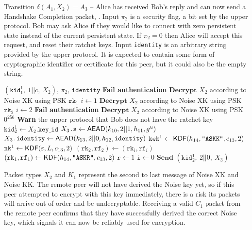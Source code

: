 \documentclass{article}
\begin{document}
\begin{algorithm}
	\caption{Transition $\delta(A_1, X_2)=A_3$ -- Alice has received Bob's reply and can now send a Handshake Completion packet, . Input $\pi_2$ is a security flag, a bit set by the upper protocol. Bob may ask Alice if they would like to connect with zero persistent state instead of the current persistent state. If $\pi_2=0$ then Alice will accept this request, and reset their ratchet keys. Input \texttt{identity} is an arbitrary string provided by the upper protocol. It is expected to contain some form of cryptographic identifier or certificate for this peer, but it could also be the empty string.}\label{alg:recv_x2}
	\begin{algorithmic}
		\Require $(\texttt{kid}^1_1,\ 1||c,\ X_2),\, \pi_2,\, \texttt{identity}$
			\State \textbf{Fail authentication}
		\EndIf
		\State $\textbf{Decrypt } X_2$ according to Noise XK using PSK $\texttt{rk}_1$
		\State $i \gets 1$
			\State $\textbf{Decrypt } X_2$ according to Noise XK using PSK $\texttt{rk}_2$
			\State $i \gets 2$
					\State \textbf{Fail authentication}
				\Else
					\State $\textbf{Decrypt } X_2$ according to Noise XK using PSK $0^{256}$
					\State \textbf{Warn} the upper protocol that Bob does not have the ratchet key
				\EndIf
			\EndIf
		\EndIf
		\State $\texttt{kid}^1_2 \gets X_2\texttt{.key\_id}$
		\State $X_3\texttt{.s} \gets \text{\sf AEAD}(k_{10}, 2||1, h_{11}, g^u)$
		\State $X_3\texttt{.identity} \gets \text{\sf AEAD}(k_{13}, 2||0, h_{12}, \texttt{identity})$
		\State $\texttt{kek}^1 \gets \text{\sf KDF}(h_{14}, \texttt{"ASKK"}, c_{13}, 2)$
		\State $\texttt{nk}^1 \gets \text{\sf KDF}(\varepsilon, L, c_{13}, 2)$
		\State $(\texttt{rk}_2, \texttt{rf}_2) \gets (\texttt{rk}_i, \texttt{rf}_i)$
		\State $(\texttt{rk}_1, \texttt{rf}_1) \gets \text{\sf KDF}(h_{14}, \texttt{"ASKR"}, c_{13}, 2)$
		\State $\texttt{r} \gets 1$
		\State $\texttt{i} \gets 0$
		\State $\textbf{Send } (\texttt{kid}^1_2,\ 2||0,\ X_3)$
	\end{algorithmic}
\end{algorithm}

Packet types $X_2$ and $K_1$ represent the second to last message of Noise XK and Noise KK. The remote peer will not have derived the Noise key yet, so if this peer attempted to encrypt with this key immediately, there is a risk its packets will arrive out of order and be undecryptable. Receiving a valid $C_1$ packet from the remote peer confirms that they have successfully derived the correct Noise key, which signals it can now be reliably used for encryption.
\end{document}
